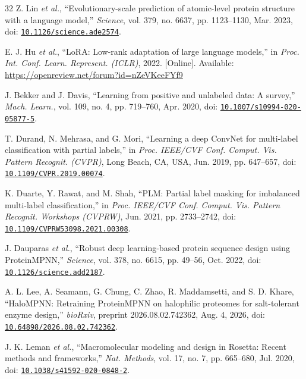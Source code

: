 \documentclass[conference]{IEEEtran}
\begin{document}
\begin{thebibliography}{32}
 Z. Lin \textit{et al.}, ``Evolutionary-scale prediction of atomic-level protein structure with a language model,'' \textit{Science}, vol. 379, no. 6637, pp. 1123--1130, Mar. 2023, doi: \href{https://doi.org/10.1126/science.ade2574}{\nolinkurl{10.1126/science.ade2574}}.

 E. J. Hu \textit{et al.}, ``LoRA: Low-rank adaptation of large language models,'' in \textit{Proc. Int. Conf. Learn. Represent. (ICLR)}, 2022. [Online]. Available: \url{https://openreview.net/forum?id=nZeVKeeFYf9}

 J. Bekker and J. Davis, ``Learning from positive and unlabeled data: A survey,'' \textit{Mach. Learn.}, vol. 109, no. 4, pp. 719--760, Apr. 2020, doi: \href{https://doi.org/10.1007/s10994-020-05877-5}{\nolinkurl{10.1007/s10994-020-05877-5}}.

 T. Durand, N. Mehrasa, and G. Mori, ``Learning a deep ConvNet for multi-label classification with partial labels,'' in \textit{Proc. IEEE/CVF Conf. Comput. Vis. Pattern Recognit. (CVPR)}, Long Beach, CA, USA, Jun. 2019, pp. 647--657, doi: \href{https://doi.org/10.1109/CVPR.2019.00074}{\nolinkurl{10.1109/CVPR.2019.00074}}.

 K. Duarte, Y. Rawat, and M. Shah, ``PLM: Partial label masking for imbalanced multi-label classification,'' in \textit{Proc. IEEE/CVF Conf. Comput. Vis. Pattern Recognit. Workshops (CVPRW)}, Jun. 2021, pp. 2733--2742, doi: \href{https://doi.org/10.1109/CVPRW53098.2021.00308}{\nolinkurl{10.1109/CVPRW53098.2021.00308}}.

 J. Dauparas \textit{et al.}, ``Robust deep learning-based protein sequence design using ProteinMPNN,'' \textit{Science}, vol. 378, no. 6615, pp. 49--56, Oct. 2022, doi: \href{https://doi.org/10.1126/science.add2187}{\nolinkurl{10.1126/science.add2187}}.

 A. L. Lee, A. Seamann, G. Chung, C. Zhao, R. Maddamsetti, and S. D. Khare, ``HaloMPNN: Retraining ProteinMPNN on halophilic proteomes for salt-tolerant enzyme design,'' \textit{bioRxiv}, preprint 2026.08.02.742362, Aug. 4, 2026, doi: \href{https://doi.org/10.64898/2026.08.02.742362}{\nolinkurl{10.64898/2026.08.02.742362}}.

 J. K. Leman \textit{et al.}, ``Macromolecular modeling and design in Rosetta: Recent methods and frameworks,'' \textit{Nat. Methods}, vol. 17, no. 7, pp. 665--680, Jul. 2020, doi: \href{https://doi.org/10.1038/s41592-020-0848-2}{\nolinkurl{10.1038/s41592-020-0848-2}}.


\end{thebibliography}
\end{document}
